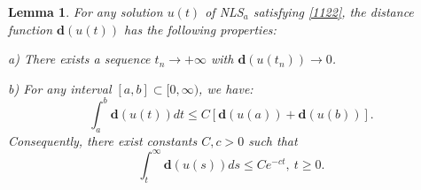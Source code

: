 \documentclass[12pt]{amsart}
\newtheorem{lemma}[theorem]{Lemma}
\begin{document}
\begin{lemma}
\label{L: sub tn} For any solution $u(t)$ of NLS$_{a}$ satisfying %
\eqref{1122}, the distance function $\mathbf{d}(u(t))$ has the following properties:

a) There exists a sequence $t_{n}\rightarrow +\infty $
with $\mathbf{d}(u(t_{n}))\rightarrow 0$.

b) For any interval $[a,b]\subset
\lbrack 0,\infty )$, we have:
\begin{equation}
\int_{a}^{b}\mathbf{d}(u(t))dt\leq C[\mathbf{d}(u(a))+\mathbf{d}(u(b))].
\label{1019}
\end{equation}
Consequently, there exist constants $C, c>0$ such that
\begin{equation}
\int_{t}^{\infty}\mathbf{d}(u(s))ds\leq Ce^{-ct}, \ t\ge 0.  \label{1113}
\end{equation}%

\end{lemma}
\end{document}
